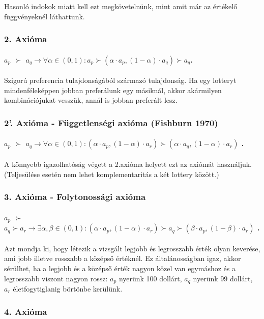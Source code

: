 \documentclass[a4paper,12pt]{article}
\begin{document}
Hasonló indokok miatt kell ezt megkövetelnünk, mint amit már az értékelő függvényeknél láthattunk.

\subsubsection{2. Axióma}
\paragraph{$a_p$  $\succ$ $a_q \rightarrow \forall \alpha \in (0,1): a_p \succ (\alpha\cdot a_p , (1-\alpha)\cdot a_q ) \succ a_q$.} 
Szigorú preferencia tulajdonságából származó tulajdonság. Ha egy lotteryt mindenféleképpen jobban preferálunk egy másiknál, akkor akármilyen kombinációjukat vesszük, annál is jobban preferált lesz.

\subsubsection{2'. Axióma - Függetlenségi axióma (Fishburn 1970)}
\paragraph{$a_p$  $\succ$ $a_q \rightarrow \forall \alpha \in (0,1): (\alpha\cdot a_p , (1-\alpha)\cdot a_r ) \succ (\alpha\cdot a_q , (1-\alpha)\cdot a_r )$ .} A könnyebb igazolhatóság végett a 2.axióma helyett ezt az axiómát használjuk. (Teljesülése esetén nem lehet komplementaritás a két lottery között.)

\subsubsection{3. Axióma - Folytonossági axióma}
\paragraph{$a_p$  $\succ$ $a_q \succ a_r \rightarrow \exists \alpha,\beta \in (0,1): (\alpha\cdot a_p , (1-\alpha)\cdot a_r )  \succ a_q \succ (\beta\cdot a_p , (1-\beta)\cdot a_r ) $ .} Azt mondja ki, hogy létezik a vizsgált legjobb és legrosszabb érték olyan keverése, ami jobb illetve rosszabb a középső értéknél. Ez általánosságban igaz, akkor sérülhet, ha a legjobb és a középső érték nagyon közel van egymáshoz és a legrosszabb viszont nagyon rossz: $a_p$ nyerünk 100 dollárt, $a_q$ nyerünk 99 dollárt, $a_r$ életfogytiglanig börtönbe kerülünk.

\subsubsection{4. Axióma}
\end{document}

